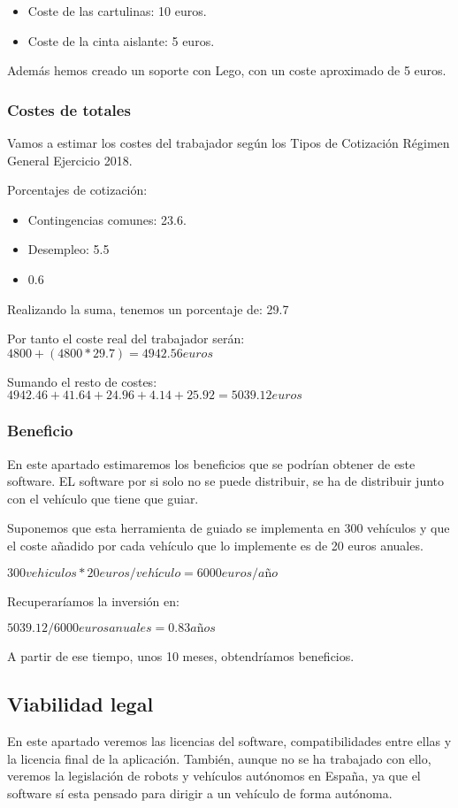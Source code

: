 \begin{itemize}
	\item Coste de las cartulinas: 10 euros.
	\item Coste de la cinta aislante: 5 euros.
\end{itemize}

Además hemos creado un soporte con Lego, con un coste aproximado de 5 euros.

\subsubsection{Costes de totales}
Vamos a estimar los costes del trabajador según los Tipos de Cotización Régimen General Ejercicio 2018\cite{cot}.

Porcentajes de cotización:
\begin{itemize}
	\item Contingencias comunes: 23.6.
	\item Desempleo: 5.5
	\item 0.6
\end{itemize}

Realizando la suma, tenemos un porcentaje de: 29.7

Por tanto el coste real del trabajador serán: $4800 + (4800*29.7) = 4942.56 euros$

Sumando el resto de costes: 
$4942.46 + 41.64 + 24.96 + 4.14 + 25.92 = 5039.12 euros$

\subsubsection{Beneficio}
En este apartado estimaremos los beneficios que se podrían obtener de este software. EL software por si solo no se puede distribuir, se ha de distribuir junto con el vehículo que tiene que guiar.

Suponemos que esta herramienta de guiado se implementa en 300 vehículos y que el coste añadido por cada vehículo que lo implemente es de 20 euros anuales.

$ 300 vehiculos * 20 euros/vehículo = 6000 euros/año$

Recuperaríamos la inversión en:

$5039.12/6000 euros anuales = 0.83 años$ 

A partir de ese tiempo, unos 10 meses, obtendríamos beneficios.


\subsection{Viabilidad legal}
En este apartado veremos las licencias del software, compatibilidades entre ellas y la licencia final de la aplicación. También, aunque no se ha trabajado con ello, veremos la legislación de robots y vehículos autónomos en España, ya que el software sí esta pensado para dirigir a un vehículo de forma autónoma.

